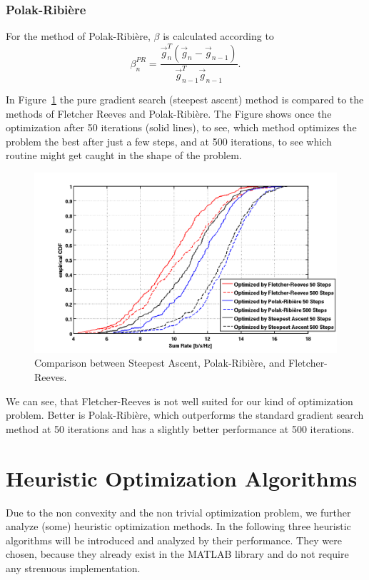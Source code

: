 \subsubsection{Polak-Ribi\`{e}re}
For the method of Polak-Ribi\`{e}re, $\beta$ is calculated according to~\cite{Polak69}
\begin{equation}
\beta_n^{PR} = \frac{\vec{g}_n^T\left(\vec{g}_n-\vec{g}_{n-1}\right)}{\vec{g}_{n-1}^T \vec{g}_{n-1}}.
\label{eq:beta_fr}
\end{equation}

In Figure~\ref{fig:pr_fr_sa} the pure gradient search (steepest ascent) method is compared to the methods of Fletcher Reeves and Polak-Ribi\`{e}re.
The Figure shows once the optimization after 50 iterations (solid lines), to see, which method optimizes the problem the best after just a few steps, and at 500 iterations, to see which routine might get caught in the shape  of the problem.
\begin{figure}[h]
\centering
  \includegraphics[width=0.9\linewidth]{images/Conjgradcomparison_edited.png}
\caption{Comparison between Steepest Ascent, Polak-Ribi\`{e}re, and Fletcher-Reeves.}
\label{fig:pr_fr_sa}
\end{figure}

We can see, that Fletcher-Reeves is not well suited for our kind of optimization problem.
Better is Polak-Ribi\`{e}re, which outperforms the standard gradient search method at 50 iterations and has a slightly better performance at 500 iterations.


\section{Heuristic Optimization Algorithms}
\label{sec:heuristic}

Due to the non convexity and the non trivial optimization problem, we further analyze (some) heuristic optimization methods.
In the following three heuristic algorithms will be introduced and analyzed by their performance.
They were chosen, because they already exist in the MATLAB library and do not require any strenuous implementation.

